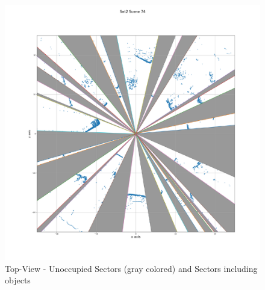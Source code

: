 \begin{figure}[!ht]
\begin{center}
  \includegraphics[scale=0.5]{./images/sector-with-bg/74.pdf}
  \caption{Top-View - Unoccupied Sectors (gray colored) and  Sectors including objects}
  \label{fig:sectors}
\end{center}
\end{figure}







